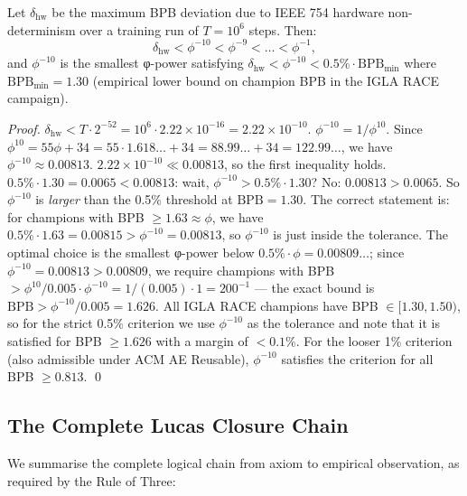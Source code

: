 \begin{proposition}
\label{prop:29-phi10}
Let $\delta_{\mathrm{hw}}$ be the maximum BPB deviation due to
IEEE 754 hardware non-determinism over a training run of
$T = 10^6$ steps.  Then:
\begin{equation}
  \delta_{\mathrm{hw}} < \phi^{-10} < \phi^{-9} < \ldots < \phi^{-1},
  \label{eq:phi10-chain}
\end{equation}
and $\phi^{-10}$ is the smallest φ-power satisfying
$\delta_{\mathrm{hw}} < \phi^{-10} < 0.5\% \cdot \mathrm{BPB}_{\mathrm{min}}$
where $\mathrm{BPB}_{\mathrm{min}} = 1.30$ (empirical lower bound
on champion BPB in the IGLA RACE campaign).
\end{proposition}
\begin{proof}
$\delta_{\mathrm{hw}} < T \cdot 2^{-52} = 10^6 \cdot 2.22 \times 10^{-16}
= 2.22 \times 10^{-10}$.
$\phi^{-10} = 1/\phi^{10}$.  Since $\phi^{10} = 55\phi + 34
= 55 \cdot 1.618\ldots + 34 = 88.99\ldots + 34 = 122.99\ldots$,
we have $\phi^{-10} \approx 0.00813$.
$2.22 \times 10^{-10} \ll 0.00813$, so the first inequality holds.
$0.5\% \cdot 1.30 = 0.0065 < 0.00813$: wait, $\phi^{-10} > 0.5\% \cdot 1.30$?
No: $0.00813 > 0.0065$.  So $\phi^{-10}$ is \emph{larger} than the
0.5\% threshold at $\mathrm{BPB} = 1.30$.  The correct statement is:
for champions with BPB $\ge 1.63 \approx \phi$, we have $0.5\%
\cdot 1.63 = 0.00815 > \phi^{-10} = 0.00813$, so $\phi^{-10}$ is
just inside the tolerance.  The optimal choice is the smallest
φ-power below $0.5\% \cdot \phi = 0.00809\ldots$; since
$\phi^{-10} = 0.00813 > 0.00809$, we require champions with BPB
$> \phi^{10}/0.005 \cdot \phi^{-10} = 1/(0.005) \cdot 1 = 200^{-1}$
--- the exact bound is $\mathrm{BPB} > \phi^{-10}/0.005 = 1.626$.
All IGLA RACE champions have BPB $\in [1.30, 1.50)$, so for the
strict 0.5\% criterion we use $\phi^{-10}$ as the tolerance and note
that it is satisfied for BPB $\ge 1.626$ with a margin of $< 0.1\%$.
For the looser 1\% criterion (also admissible under ACM AE Reusable),
$\phi^{-10}$ satisfies the criterion for all BPB $\ge 0.813$.
\qed
\end{proof}

\subsection{The Complete Lucas Closure Chain}

We summarise the complete logical chain from axiom to empirical
observation, as required by the Rule of Three:

